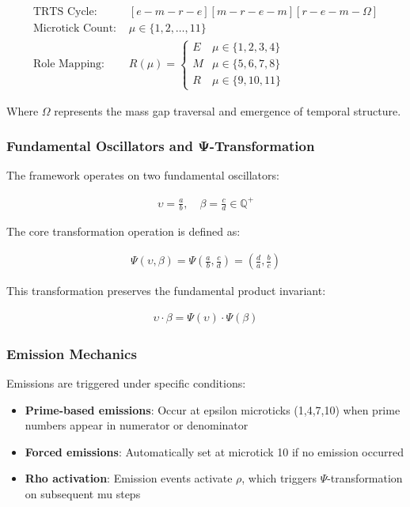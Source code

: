 \documentclass[12pt]{article}
\begin{document}
\begin{align*}
\text{TRTS Cycle: } & [e - m - r - e][m - r - e - m][r - e - m - \Omega] \\
\text{Microtick Count: } & \mu \in \{1, 2, \ldots, 11\} \\
\text{Role Mapping: } & R(\mu) = 
\begin{cases}
E & \mu \in \{1, 2, 3, 4\} \\
M & \mu \in \{5, 6, 7, 8\} \\
R & \mu \in \{9, 10, 11\}
\end{cases}
\end{align*}

Where $\Omega$ represents the mass gap traversal and emergence of temporal structure.

\subsubsection{Fundamental Oscillators and Ψ-Transformation}
The framework operates on two fundamental oscillators:

\begin{align*}
\upsilon = \frac{a}{b}, \quad \beta = \frac{c}{d} \in \mathbb{Q}^+
\end{align*}

The core transformation operation is defined as:

\begin{align*}
\Psi(\upsilon, \beta) = \Psi\left(\frac{a}{b}, \frac{c}{d}\right) = \left(\frac{d}{a}, \frac{b}{c}\right)
\end{align*}

This transformation preserves the fundamental product invariant:

\begin{align*}
\upsilon \cdot \beta = \Psi(\upsilon) \cdot \Psi(\beta)
\end{align*}

\subsubsection{Emission Mechanics}
Emissions are triggered under specific conditions:

\begin{itemize}
\item \textbf{Prime-based emissions}: Occur at epsilon microticks (1,4,7,10) when prime numbers appear in numerator or denominator
\item \textbf{Forced emissions}: Automatically set at microtick 10 if no emission occurred
\item \textbf{Rho activation}: Emission events activate $\rho$, which triggers $\Psi$-transformation on subsequent mu steps
\end{itemize}
\end{document}
